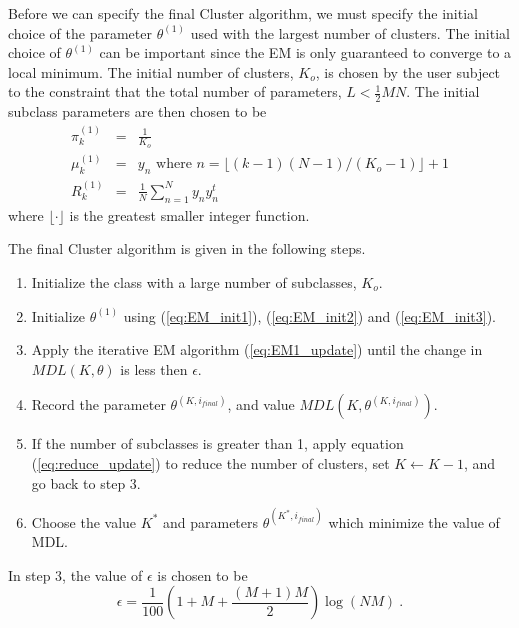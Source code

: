 \documentclass[12pt]{article}
\begin{document}
Before we can specify the final Cluster algorithm,
we must specify the initial choice 
of the parameter $\theta^{(1)}$ used with the largest number of clusters.
The initial choice of $\theta^{(1)}$ can be important
since the EM is only guaranteed to converge to a local minimum.
The initial number of clusters, $K_o$, is chosen by the user
subject to the constraint that the total number of parameters, 
$L<\frac{1}{2}MN$.
The initial subclass parameters are then chosen to be
\begin{eqnarray}
\label{eq:EM_init1}
\pi_k^{(1)} &=& \frac{1}{K_o} \\
\label{eq:EM_init2}
\mu_k^{(1)} &=& y_n \mbox{ where } n = \lfloor (k-1)(N-1)/(K_o-1) \rfloor +1\\
\label{eq:EM_init3}
R_k^{(1)} &=& \frac{1}{N} \sum_{n=1}^N y_n y_n^t
\end{eqnarray}
where $\lfloor \cdot \rfloor$ is the greatest smaller integer function.

The final Cluster algorithm is given in the following steps.
\begin{enumerate}
\item Initialize the class with a large number of subclasses, $K_o$.
\item Initialize $\theta^{(1)}$ using (\ref{eq:EM_init1}), (\ref{eq:EM_init2}) and (\ref{eq:EM_init3}). 
\item Apply the iterative EM algorithm (\ref{eq:EM1_update}) until the change in
$MDL(K,\theta)$ is less then $\epsilon$.
\item Record the parameter $\theta^{(K,i_{final})}$, and value $MDL(K,\theta^{(K,i_{final})})$.
\item If the number of subclasses is greater than 1, 
apply equation (\ref{eq:reduce_update}) to reduce the number of clusters,
set $K\leftarrow K-1$, and go back to step 3.
\item Choose the value $K^*$ and parameters $\theta^{(K^*,i_{final})}$ 
which minimize the value of MDL.
\end{enumerate}

In step 3, the value of $\epsilon$ is chosen to be
$$
\epsilon = \frac{1}{100} \left( 1+M+\frac{(M+1)M}{2} \right) \log (NM) \ . 
$$
\end{document}
